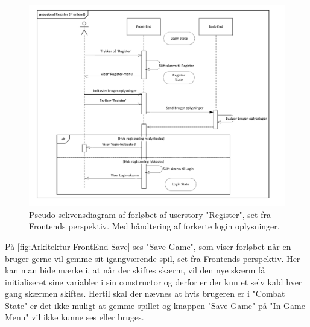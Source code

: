 \begin{figure}[h]
\centering
\includegraphics[width = \textwidth]{02-Body/Images/Front-End_-_Arkitektur-register.pdf}
\caption{Pseudo sekvensdiagram af forløbet af userstory "Register", set fra Frontends perspektiv. Med håndtering af forkerte login oplysninger.}
\label{fig:Arkitektur-FrontEnd-Register}
\end{figure}

\noindent På \autoref{fig:Arkitektur-FrontEnd-Save} ses "Save Game", som viser forløbet når en bruger gerne vil gemme sit igangværende spil, set fra Frontends perspektiv. Her kan man bide mærke i, at når der skiftes skærm, vil den nye skærm få initialiseret sine variabler i sin constructor og derfor er der kun et selv kald hver gang skærmen skiftes.
Hertil skal der nævnes at hvis brugeren er i "Combat State" er det ikke muligt at gemme spillet og knappen "Save Game" på "In Game Menu" vil ikke kunne ses eller bruges.\\

